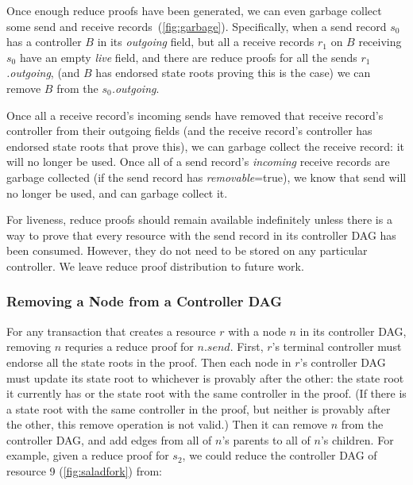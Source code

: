 \documentclass[a4paper,USenglish,cleveref, autoref, thm-restate, anonymous]{lipics-v2021}
\begin{document}
Once enough reduce proofs have been generated, we can even garbage collect some send and receive records~(\cref{fig:garbage}). 
Specifically, when a send record $s_0$ has a controller $B$ in its \emph{outgoing} field, but all a receive records $r_1$ on $B$ receiving $s_0$ have an empty \emph{live} field, and there are reduce proofs for all the sends \emph{$r_1$.outgoing}, (and $B$ has endorsed state roots proving this is the case) we can remove $B$ from the $s_0$\emph{.outgoing}. 

Once all a receive record's incoming sends have removed that receive record's controller from their outgoing fields (and the receive record's controller has endorsed state roots that prove this), we can garbage collect the receive record: it will no longer be used. 
Once all of a send record's \emph{incoming} receive records are garbage collected (if the send record has \emph{removable}=true), we know that send will no longer be used, and can garbage collect it.

For liveness, reduce proofs should remain available indefinitely unless there is a way to prove that every resource with the send record in its controller DAG has been consumed. 
However, they do not need to be stored on any particular controller. 
We leave reduce proof distribution to future work. 

\subsubsection{Removing a Node from a Controller DAG}
For any transaction that creates a resource $r$ with a node $n$ in its controller DAG, removing $n$ requries a reduce proof for $n.send$.
First, $r$'s terminal controller must endorse all the state roots in the proof.
Then each node in $r$'s controller DAG must update its state root to whichever is provably after the other: the state root it currently has or the state root with the same controller in the proof. 
(If there is a state root with the same controller in the proof, but neither is provably after the other, this remove operation is not valid.)
Then it can remove $n$ from the controller DAG, and add edges from all of $n$'s parents to all of $n$'s children. 
For example, given a reduce proof for $s_2$, we could reduce the controller DAG of resource 9 (\cref{fig:saladfork}) from:
\end{document}

